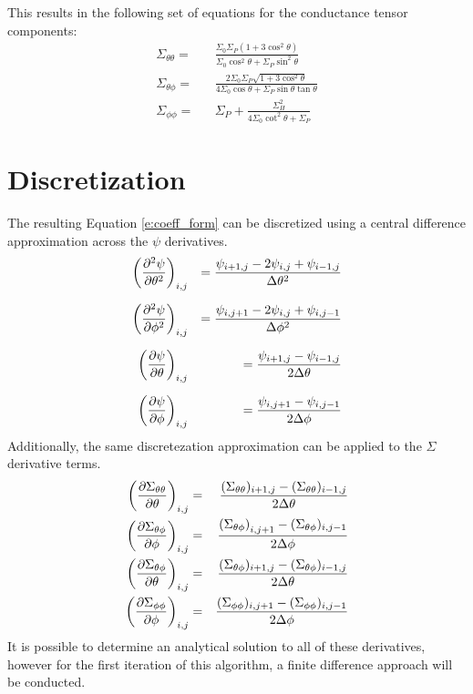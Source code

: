 \documentclass{article}
\begin{document}
This results in the following set of equations for the conductance tensor components:
\begin{align}
    \label{e:sig_thth}\Sigma_{\theta\theta} 
    =&& \frac{\Sigma_0\Sigma_P(1+3\cos^2\theta)}{\Sigma_0\cos^2 \theta+ \Sigma_P\sin^2\theta}\\
    \label{e:sig_thph}\Sigma_{\theta\phi} 
    =&& \frac{2\Sigma_0\Sigma_P\sqrt{1+3\cos^2\theta}}{4\Sigma_0\cos \theta+ \Sigma_P\sin\theta\tan\theta}\\
    \label{e:sig_phph}\Sigma_{\phi\phi} 
    =&& \Sigma_P + \frac{\Sigma^2_H}{4\Sigma_0\cot^2\theta + \Sigma_P}
\end{align}

\section{Discretization}
The resulting Equation \ref{e:coeff_form} can be discretized using a central difference approximation across the $\psi$ derivatives.
\begin{align}
    \left(\pdv[2]{\psi}{\theta}\right)_{i,j} 
    &&= \frac{\psi_{i+1,j} - 2\psi_{i,j} + \psi_{i-1,j}}{\Delta\theta^2}\\[6pt]
    \left(\pdv[2]{\psi}{\phi}\right)_{i,j} 
    &&= \frac{\psi_{i,j+1} - 2\psi_{i,j} + \psi_{i,j-1}}{\Delta\phi^2}\\[6pt]
    \left(\pdv{\psi}{\theta}\right)_{i,j} 
    &&= \frac{\psi_{i+1,j} - \psi_{i-1,j}}{2\Delta\theta}\\[6pt]
    \left(\pdv{\psi}{\phi}\right)_{i,j} 
    &&= \frac{\psi_{i,j+1} - \psi_{i,j-1}}{2\Delta\phi}
\end{align}
Additionally, the same discretezation approximation can be applied to the $\Sigma$ derivative terms.
\begin{align}
    \label{e:dSig_thth_th}\left(\pdv{\Sigma_{\theta\theta}}{\theta}\right)_{i,j} =&& \frac{(\Sigma_{\theta\theta})_{i+1,j} - (\Sigma_{\theta\theta})_{i-1,j}}{2\Delta\theta}\\
    \label{e:dSig_thph_ph}\left(\pdv{\Sigma_{\theta\phi}}{\phi}\right)_{i,j} =&& \frac{\left(\Sigma_{\theta\phi}\right)_{i,j+1} - (\Sigma_{\theta\phi})_{i,j-1}}{2\Delta\phi}\\
    \label{e:dSig_thph_th}\left(\pdv{\Sigma_{\theta\phi}}{\theta}\right)_{i,j} =&& \frac{(\Sigma_{\theta\phi})_{i+1,j}- (\Sigma_{\theta\phi})_{i-1,j}}{2\Delta\theta}\\
    \label{e:dSig_phph_ph}\left(\pdv{\Sigma_{\phi\phi}}{\phi}\right)_{i,j} =&& \frac{(\Sigma_{\phi\phi})_{i,j+1} - (\Sigma_{\phi\phi})_{i,j-1}}{2\Delta\phi}
\end{align}
It is possible to determine an analytical solution to all of these derivatives, however for the first iteration of this algorithm, a finite difference approach will be conducted.
\end{document}
